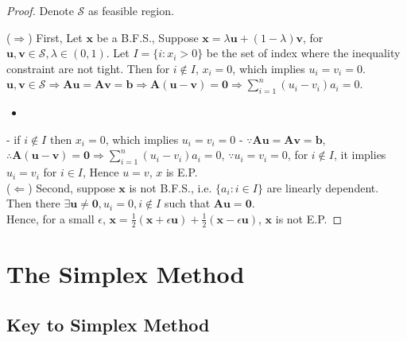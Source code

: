 			\begin{proof}
				Denote $\mathcal{S}$ as feasible region. 

				($\Rightarrow$) First, Let $\mathbf{x}$ be a B.F.S., Suppose $\mathbf{x} =\lambda \mathbf{u} + (1 - \lambda) \mathbf{v}$, for $\mathbf{u}, \mathbf{v} \in \mathcal{S}, \lambda \in (0, 1)$. Let $I = \{i: x_i > 0\}$ be the set of index where the inequality constraint are not tight. Then for $i \notin I$, $x_i = 0$, which implies $u_i = v_i = 0$. $\mathbf{u}, \mathbf{v} \in \mathcal{S} \Rightarrow \mathbf{Au} = \mathbf{Av} = \mathbf{b} \Rightarrow \mathbf{A (u - v)} = \mathbf{0} \Rightarrow \sum_{i = 1}^n (u_i - v_i)a_i = 0$.
				\begin{itemize}
					\item 
				\end{itemize}
				- if $i \notin I$ then $x_i = 0$, which implies $u_i = v_i = 0$
				- $\because \mathbf{Au} = \mathbf{Av} = \mathbf{b}$, $\therefore \mathbf{A(u-v)} = \textbf{0} \Rightarrow \sum_{i=1}^n(u_i - v_i)a_i = 0$, $\because u_i = v_i = 0$, for $i\notin I$, it implies $u_i = v_i$ for $i\in I$, Hence $u=v$, $x$ is E.P.\\

				($\Leftarrow$) Second, suppose $\mathbf{x}$ is not B.F.S., i.e. $\{a_i: i \in I\}$ are linearly dependent.\\
				Then there $\exists \mathbf{u}\ne \mathbf{0}, u_i =0 , i\notin I$ such that $\mathbf{Au}=\mathbf{0}$.\\
				Hence, for a small $\epsilon$, $\mathbf{x}=\frac12(\mathbf{x} + \epsilon \mathbf{u}) + \frac12(\mathbf{x} - \epsilon \mathbf{u})$, $\mathbf{x}$ is not E.P.
			\end{proof}

		\section{The Simplex Method}
			\subsection{Key to Simplex Method}
